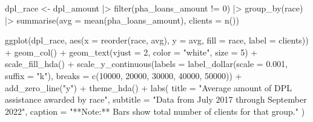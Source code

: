 \documentclass[
  letterpaper,
  DIV=11,
  numbers=noendperiod]{scrartcl}
\newenvironment{Shaded}{\begin{snugshade}}{\end{snugshade}}
\newcommand{\AttributeTok}[1]{\textcolor[rgb]{0.40,0.45,0.13}{#1}}
\newcommand{\DecValTok}[1]{\textcolor[rgb]{0.68,0.00,0.00}{#1}}
\newcommand{\FloatTok}[1]{\textcolor[rgb]{0.68,0.00,0.00}{#1}}
\newcommand{\FunctionTok}[1]{\textcolor[rgb]{0.28,0.35,0.67}{#1}}
\newcommand{\NormalTok}[1]{\textcolor[rgb]{0.00,0.23,0.31}{#1}}
\newcommand{\OtherTok}[1]{\textcolor[rgb]{0.00,0.23,0.31}{#1}}
\newcommand{\SpecialCharTok}[1]{\textcolor[rgb]{0.37,0.37,0.37}{#1}}
\newcommand{\StringTok}[1]{\textcolor[rgb]{0.13,0.47,0.30}{#1}}
\begin{document}
\begin{Shaded}
\begin{Highlighting}[]
\NormalTok{dpl\_race }\OtherTok{\textless{}{-}}\NormalTok{ dpl\_amount }\SpecialCharTok{|\textgreater{}} 
  \FunctionTok{filter}\NormalTok{(pha\_loans\_amount }\SpecialCharTok{!=} \DecValTok{0}\NormalTok{) }\SpecialCharTok{|\textgreater{}} 
  \FunctionTok{group\_by}\NormalTok{(race) }\SpecialCharTok{|\textgreater{}} 
  \FunctionTok{summarise}\NormalTok{(}\AttributeTok{avg =} \FunctionTok{mean}\NormalTok{(pha\_loans\_amount),}
            \AttributeTok{clients =} \FunctionTok{n}\NormalTok{())}

\FunctionTok{ggplot}\NormalTok{(dpl\_race, }\FunctionTok{aes}\NormalTok{(}\AttributeTok{x =} \FunctionTok{reorder}\NormalTok{(race, avg), }\AttributeTok{y =}\NormalTok{ avg, }\AttributeTok{fill =}\NormalTok{ race, }\AttributeTok{label =}\NormalTok{ clients)) }\SpecialCharTok{+}
  \FunctionTok{geom\_col}\NormalTok{() }\SpecialCharTok{+}
  \FunctionTok{geom\_text}\NormalTok{(}\AttributeTok{vjust =} \DecValTok{2}\NormalTok{,}
            \AttributeTok{color =} \StringTok{"white"}\NormalTok{,}
            \AttributeTok{size =} \DecValTok{5}\NormalTok{) }\SpecialCharTok{+}
  \FunctionTok{scale\_fill\_hda}\NormalTok{() }\SpecialCharTok{+}
  \FunctionTok{scale\_y\_continuous}\NormalTok{(}\AttributeTok{labels =} \FunctionTok{label\_dollar}\NormalTok{(}\AttributeTok{scale =} \FloatTok{0.001}\NormalTok{, }\AttributeTok{suffix =} \StringTok{"k"}\NormalTok{),}
                     \AttributeTok{breaks =} \FunctionTok{c}\NormalTok{(}\DecValTok{10000}\NormalTok{, }\DecValTok{20000}\NormalTok{, }\DecValTok{30000}\NormalTok{, }\DecValTok{40000}\NormalTok{, }\DecValTok{50000}\NormalTok{)) }\SpecialCharTok{+}
  \FunctionTok{add\_zero\_line}\NormalTok{(}\StringTok{"y"}\NormalTok{) }\SpecialCharTok{+}
  \FunctionTok{theme\_hda}\NormalTok{() }\SpecialCharTok{+}
  \FunctionTok{labs}\NormalTok{(}
    \AttributeTok{title =} \StringTok{"Average amount of DPL assistance awarded by race"}\NormalTok{,}
    \AttributeTok{subtitle =} \StringTok{"Data from July 2017 through September 2022"}\NormalTok{,}
    \AttributeTok{caption =} \StringTok{"**Note:** Bars show total number of clients for that group."}
\NormalTok{  )}
\end{Highlighting}
\end{Shaded}
\end{document}
